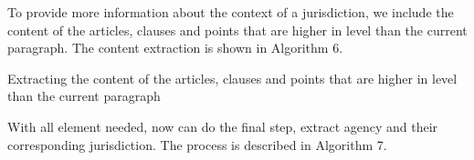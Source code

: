 \begin{algorithm}
To provide more information about the context of a jurisdiction, we include the content of the articles, clauses and points that are higher in level than the current paragraph. The content extraction is shown in Algorithm 6.

\begin{algorithm}
    \caption{Extracting the content of the articles, clauses and points that are higher in level than the current paragraph}
\end{algorithm}

With all element needed, now can do the final step, extract agency and their corresponding jurisdiction. The process is described in Algorithm 7.


\end{algorithm}
